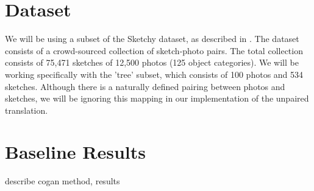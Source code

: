 \documentclass[10pt,twocolumn,letterpaper]{article}
\begin{document}
\section{Dataset}
We will be using a subset of the Sketchy dataset, as described in \cite{sangkloy2016sketchy}. The dataset consists of a crowd-sourced collection of sketch-photo pairs. The total collection consists of 75,471 sketches of 12,500 photos (125 object categories). We will be working specifically with the 'tree' subset, which consists of 100 photos and 534 sketches. Although there is a naturally defined pairing between photos and sketches, we will be ignoring this mapping in our implementation of the unpaired translation.

\section{Baseline Results}
describe cogan method, results

{\small


}
\end{document}
